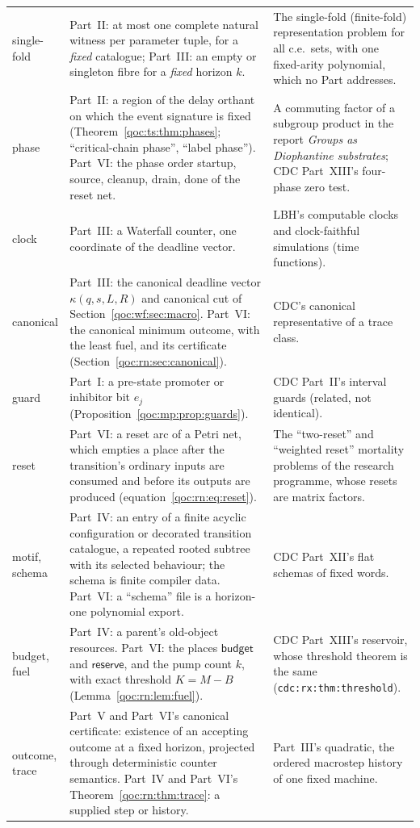 \documentclass[11pt,letterpaper]{article}
\theoremstyle{definition}
\theoremstyle{remark}
\newcommand{\cani}{\kappa}
\newcommand{\res}{\mathsf{reserve}}
\newcommand{\bud}{\mathsf{budget}}
\newcommand{\lab}[1]{\nolinkurl{#1}}
\begin{document}
\begin{longtable}{@{}L{0.15\textwidth}L{0.38\textwidth}L{0.38\textwidth}@{}}
single-fold & Part~II: at most one complete natural witness per parameter tuple, for a \emph{fixed} catalogue; Part~III: an empty or singleton fibre for a \emph{fixed} horizon $k$. & The single-fold (finite-fold) representation problem for all c.e.\ sets, with one fixed-arity polynomial, which no Part addresses. \\
phase & Part~II: a region of the delay orthant on which the event signature is fixed (Theorem~\ref{qoc:ts:thm:phases}; ``critical-chain phase'', ``label phase''). Part~VI: the phase order startup, source, cleanup, drain, done of the reset net. & A commuting factor of a subgroup product in the report \emph{Groups as Diophantine substrates}; CDC Part~XIII's four-phase zero test. \\
clock & Part~III: a Waterfall counter, one coordinate of the deadline vector. & LBH's computable clocks and clock-faithful simulations (time functions). \\
canonical & Part~III: the canonical deadline vector $\cani(q,s,L,R)$ and canonical cut of Section~\ref{qoc:wf:sec:macro}. Part~VI: the canonical minimum outcome, with the least fuel, and its certificate (Section~\ref{qoc:rn:sec:canonical}). & CDC's canonical representative of a trace class. \\
guard & Part~I: a pre-state promoter or inhibitor bit $e_j$ (Proposition~\ref{qoc:mp:prop:guards}). & CDC Part~II's interval guards (related, not identical). \\
reset & Part~VI: a reset arc of a Petri net, which empties a place after the transition's ordinary inputs are consumed and before its outputs are produced (equation~\eqref{qoc:rn:eq:reset}). & The ``two-reset'' and ``weighted reset'' mortality problems of the research programme, whose resets are matrix factors. \\
motif, schema & Part~IV: an entry of a finite acyclic configuration or decorated transition catalogue, a repeated rooted subtree with its selected behaviour; the schema is finite compiler data. Part~VI: a ``schema'' file is a horizon-one polynomial export. & CDC Part~XII's flat schemas of fixed words. \\
budget, fuel & Part~IV: a parent's old-object resources. Part~VI: the places $\bud$ and $\res$, and the pump count $k$, with exact threshold $K=M-B$ (Lemma~\ref{qoc:rn:lem:fuel}). & CDC Part~XIII's reservoir, whose threshold theorem is the same (\lab{cdc:rx:thm:threshold}). \\
outcome, trace & Part~V and Part~VI's canonical certificate: existence of an accepting outcome at a fixed horizon, projected through deterministic counter semantics. Part~IV and Part~VI's Theorem~\ref{qoc:rn:thm:trace}: a supplied step or history. & Part~III's quadratic, the ordered macrostep history of one fixed machine. \\

\end{longtable}
\end{document}
